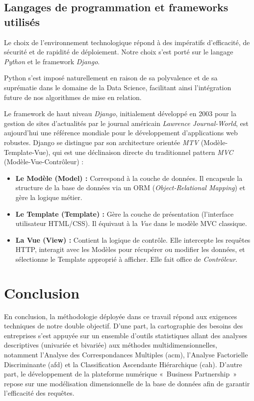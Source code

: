 \documentclass[12pt, a4paper, oneside]{report}
\begin{document}
\subsection{Langages de programmation et frameworks utilisés}
Le choix de l'environnement technologique répond à des impératifs d'efficacité, de sécurité et de rapidité de déploiement. Notre choix s'est porté sur le langage \textit{Python} et le framework \textit{Django}. 

Python s'est imposé naturellement en raison de sa polyvalence et de sa suprématie dans le domaine de la Data Science, facilitant ainsi l'intégration future de nos algorithmes de mise en relation. 

Le framework de haut niveau \textit{Django}, initialement développé en 2003 pour la gestion de sites d'actualités par le journal américain \textit{Lawrence Journal-World}, est aujourd'hui une référence mondiale pour le développement d'applications web robustes. Django se distingue par son architecture orientée \textit{MTV} (Modèle-Template-Vue), qui est une déclinaison directe du traditionnel pattern \textit{MVC} (Modèle-Vue-Contrôleur) :
\begin{itemize}
	\item \textbf{Le Modèle (Model) :} Correspond à la couche de données. Il encapsule la structure de la base de données via un ORM (\textit{Object-Relational Mapping}) et gère la logique métier.
	\item \textbf{Le Template (Template) :} Gère la couche de présentation (l'interface utilisateur HTML/CSS). Il équivaut à la \textit{Vue} dans le modèle MVC classique.
	\item \textbf{La Vue (View) :} Contient la logique de contrôle. Elle intercepte les requêtes HTTP, interagit avec les Modèles pour récupérer ou modifier les données, et sélectionne le Template approprié à afficher. Elle fait office de \textit{Contrôleur}.
\end{itemize}
	
	\section*{Conclusion}
	En conclusion, la méthodologie déployée dans ce travail répond aux exigences techniques de notre double objectif. D'une part, la cartographie des besoins des entreprises s'est appuyée sur un ensemble d'outils statistiques allant des analyses descriptives (univariée et bivariée) aux méthodes multidimensionnelles, notamment l'Analyse des Correspondances Multiples (\gls{acm}), l'Analyse Factorielle Discriminante (\gls{afd}) et la Classification Ascendante Hiérarchique (\gls{cah}). D'autre part, le développement de la plateforme numérique «~Business Partnership~» repose sur une modélisation dimensionnelle de la base de données afin de garantir l'efficacité des requêtes.
\end{document}
